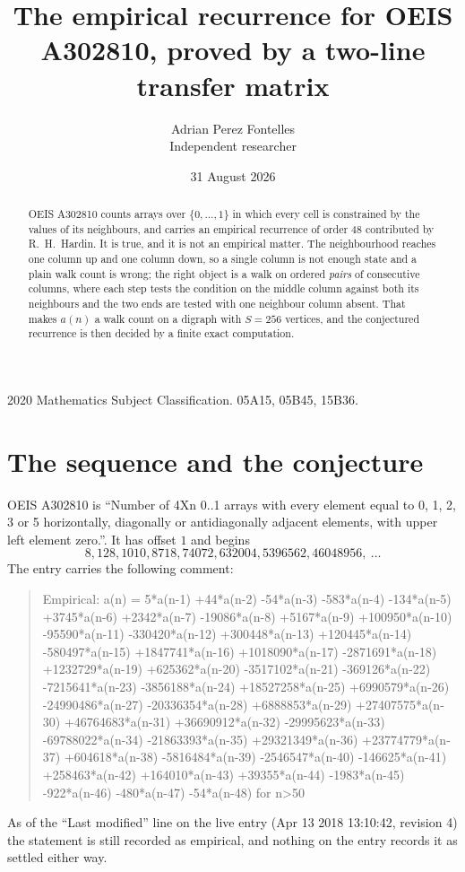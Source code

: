 \documentclass[11pt,a4paper]{article}
\title{The empirical recurrence for OEIS A302810, proved by a two-line transfer matrix}
\author{Adrian Perez Fontelles\\ \small Independent researcher}
\date{31 August 2026}
\theoremstyle{plain}
\theoremstyle{definition}
\begin{document}
\maketitle

\begin{abstract}
OEIS A302810 counts arrays over $\{0,\dots,1\}$ in which every cell is constrained by the
values of its neighbours, and carries an empirical recurrence of order $48$ contributed
by R.~H.~Hardin. It is true, and it is not an empirical matter. The neighbourhood reaches one
column up and one column down, so a single column is not enough state and a plain walk count
is wrong; the right object is a walk on ordered \emph{pairs} of consecutive columns, where
each step tests the condition on the middle column against both its neighbours and the two
ends are tested with one neighbour column absent. That makes $a(n)$ a walk count on a digraph
with $S=256$ vertices, and the conjectured recurrence is then decided by a finite exact
computation.
\end{abstract}

\noindent\small 2020 Mathematics Subject Classification. 05A15, 05B45, 15B36.\normalsize

\section{The sequence and the conjecture}

OEIS A302810 is ``Number of 4Xn 0..1 arrays with every element equal to 0, 1, 2, 3 or 5 horizontally, diagonally or antidiagonally adjacent elements, with upper left element zero.''. It has offset $1$ and begins
\[
8, 128, 1010, 8718, 74072, 632004, 5396562, 46048956,\ \dots
\]
The entry carries the following comment:
\begin{quote}\small
Empirical: a(n) = 5*a(n-1) +44*a(n-2) -54*a(n-3) -583*a(n-4) -134*a(n-5) +3745*a(n-6) +2342*a(n-7) -19086*a(n-8) +5167*a(n-9) +100950*a(n-10) -95590*a(n-11) -330420*a(n-12) +300448*a(n-13) +120445*a(n-14) -580497*a(n-15) +1847741*a(n-16) +1018090*a(n-17) -2871691*a(n-18) +1232729*a(n-19) +625362*a(n-20) -3517102*a(n-21) -369126*a(n-22) -7215641*a(n-23) -3856188*a(n-24) +18527258*a(n-25) +6990579*a(n-26) -24990486*a(n-27) -20336354*a(n-28) +6888853*a(n-29) +27407575*a(n-30) +46764683*a(n-31) +36690912*a(n-32) -29995623*a(n-33) -69788022*a(n-34) -21863393*a(n-35) +29321349*a(n-36) +23774779*a(n-37) +604618*a(n-38) -5816484*a(n-39) -2546547*a(n-40) -146625*a(n-41) +258463*a(n-42) +164010*a(n-43) +39355*a(n-44) -1983*a(n-45) -922*a(n-46) -480*a(n-47) -54*a(n-48) for n>50
\end{quote}
As of the ``Last modified'' line on the live entry (Apr 13 2018 13:10:42, revision 4) the statement is
still recorded as empirical, and nothing on the entry records it as settled either way.
\end{document}
